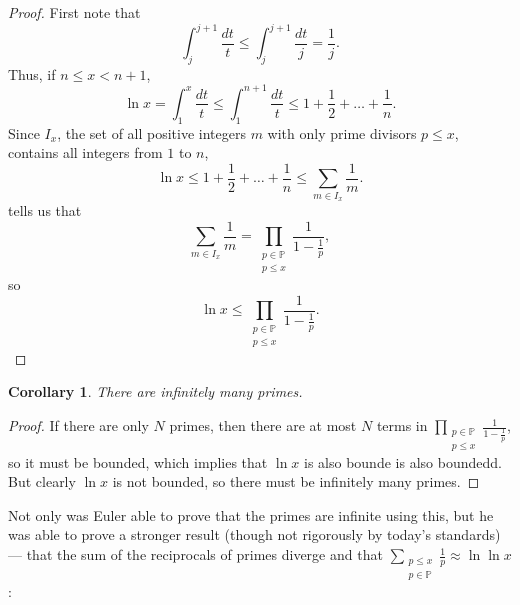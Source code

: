 \documentclass[a4paper]{article}
\newtheorem{corollary}{Corollary}[theorem]
\theoremstyle{definition}
\theoremstyle{remark}
\begin{document}
\begin{proof}
  First note that
  \[\int_j^{j+1}\frac{dt}{t}\le\int_j^{j+1}\frac{dt}{j}=\frac{1}{j}
  .
  \]
  Thus, if $n\le x<n+1$, 
  \[
  \ln x=\int_1^x\frac{dt}{t}\le\int_1^{n+1}\frac{dt}{t}\le1+\frac{1}{2}+\dots+\frac{1}{n}
  .
  \]
  Since $I_x$, the set of all positive integers $m$ with only prime divisors $p\le x$, contains all integers from $1$ to $n$,
  \[
  \ln x\le1+\frac{1}{2}+\dots+\frac{1}{n}\le\sum_{m\in I_x}\frac{1}{m}
  .
  \]
   tells us that 
  \[\sum_{m\in I_x}\frac{1}{m}=\prod\limits_{\substack{p\in\mathbb{P}\\p\le x}}\frac{1}{1-\frac{1}{p}}
  ,
  \]
  so
  \[
  \ln x\le \prod\limits_{\substack{p\in\mathbb{P}\\p\le x}}\frac{1}{1-\frac{1}{p}}
  .
  \]
\end{proof}
\begin{corollary}
  There are infinitely many primes.
  \label{cor:EulerInfinitePrimes}
\end{corollary}
\begin{proof}
  If there are only $N$ primes, then there are at most $N$ terms in $\displaystyle\prod\limits_{\substack{p\in\mathbb{P}\\p\le x}}\frac{1}{1-\frac{1}{p}}$, so it must be bounded, which implies that $\ln x$ is also bounde is also boundedd. But clearly $\ln x$ is not bounded, so there must be infinitely many primes.
\end{proof}

Not only was Euler able to prove that the primes are infinite using this, but he was able to prove a stronger result (though not rigorously by today's standards) --- that the sum of the reciprocals of primes diverge and that $\displaystyle\sum_{\substack{p\le x\\p\in\mathbb{P}}}\frac{1}{p}\approx\ln\ln x$:
\end{document}
